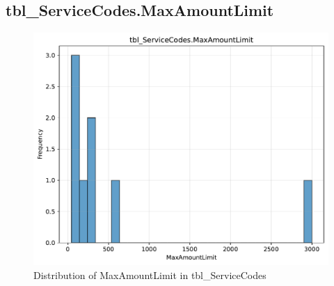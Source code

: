 \subsection{tbl\_ServiceCodes.MaxAmountLimit}

\begin{figure}[htbp]
\centering
\includegraphics[width=\textwidth]{figures/dbo_tbl_ServiceCodes_MaxAmountLimit.pdf}
\caption{Distribution of MaxAmountLimit in tbl\_ServiceCodes}
\end{figure}\newpage
